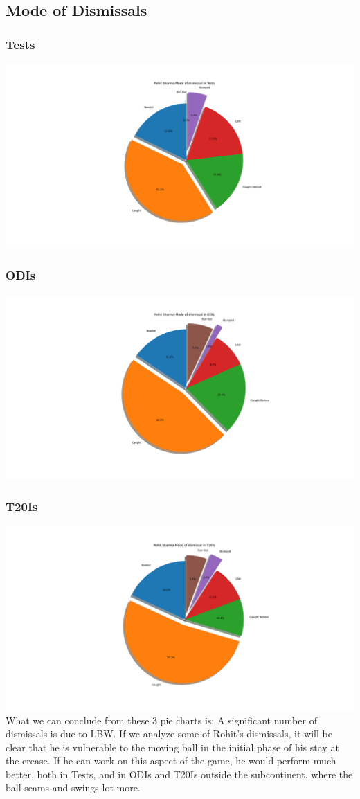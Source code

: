 \documentclass[twoside,10pt,a4paper]{article}
\numberwithin{equation}{section}
\numberwithin{figure}{section}
\begin{document}
\subsection{Mode of Dismissals}
\subsubsection{Tests}
\includegraphics[scale=0.30]{Modeofdismissal_Tests.png}
\subsubsection{ODIs}
\includegraphics[scale=0.30]{Modeofdismissal_ODI.png}
\subsubsection{T20Is}
\includegraphics[scale=0.30]{Modeofdismissal_T20Is.png}
What we can conclude from these 3 pie charts is: A significant number of dismissals is due to LBW. If we analyze some of Rohit's dismissals, it will be clear that he is vulnerable to the moving ball in the initial phase of his stay at the crease. If he can work on this aspect of the game, he would perform much better, both in Tests, and in ODIs and T20Is outside the subcontinent, where the ball seams and swings lot more.
\end{document}
